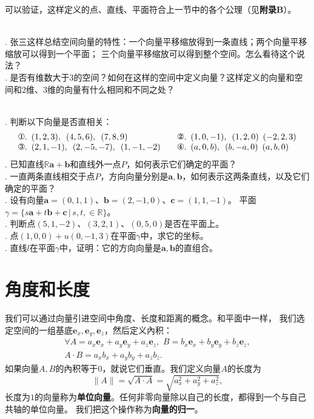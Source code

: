 \documentclass[12pt,UTF8]{ctexbook}
\begin{document}
可以验证，这样定义的点、直线、平面符合上一节中的各个公理（见\textbf{附录B}）。

\begin{sk}
    \mbox{}  \\
    . 张三这样总结空间向量的特性：一个向量平移缩放得到一条直线；两个向量平移缩放可以得到一个平面；
    三个向量平移缩放可以得到整个空间。怎么看待这个说法？\\
    . 是否有维数大于$3$的空间？如何在这样的空间中定义向量？这样定义的向量和空间和$2$维、$3$维的向量有什么相同和不同之处？
\end{sk}

\begin{xt}
    \mbox{}  \\
    . 判断以下向量是否直相关：\\
    $$
    \begin{array}{ll}
        \mbox{\ding{172}}.\,\,\, (1,2,3),\,\,\,(4,5,6), \,\,\,(7,8,9) \quad & \mbox{\ding{173}}.\,\,\, (1,0,-1),\,\,\, (1,2,0) \,\,\,(-2,2,3)  \\
        \mbox{\ding{174}}.\,\,\, (2,1,-1), \,\,\, (2,-5,-7), \,\,\,(1,-1,-2) \quad & \mbox{\ding{175}}.\,\,\, (a,0,b),\,\,\, (b,-a,0) \,\,\,(a,b,0) 
    \end{array}
    $$
    . 已知直线$\mathbb{R}\mathbf{a}+\mathbf{b}$和直线外一点$P$，如何表示它们确定的平面？\\
    . 一直两条直线相交于点$P$，方向向量分别是$\mathbf{a},\mathbf{b}$，如何表示这两条直线，以及它们确定的平面？\\
    . 设有向量$\mathbf{a}=(0,1,1)$、$\mathbf{b}=(2,-1,0)$、$\mathbf{c}=(1,1,-1)$。
    平面$\gamma = \{s\mathbf{a} + t\mathbf{b} + \mathbf{c} \, | \, s,t,\in\mathbb{R}\}$。\\
    . 判断点$(5,1,-2)$、$(3,2,1)$、$(0,5,0)$是否在平面上。\\
    . 点$(1,0,0)+u(0,-1,3)$在平面$\gamma$中，求它的坐标。\\
    . 直线$l$在平面$\gamma$中，证明：它的方向向量是$\mathbf{a},\mathbf{b}$的直组合。
\end{xt}

\section{角度和长度}
我们可以通过向量引进空间中角度、长度和距离的概念。和平面中一样，
我们选定空间的一组基底$\mathbf{e}_x,\mathbf{e}_y,\mathbf{e}_z$，然后定义內积：
$$
\begin{array}{c}
    \forall  A = a_x\mathbf{e}_x+a_y\mathbf{e}_y+a_z\mathbf{e}_z,\,\,B = b_x\mathbf{e}_x+b_y\mathbf{e}_y+b_z\mathbf{e}_z,  \\
     A\cdot B = a_xb_x + a_yb_y + a_zb_z. 
\end{array}
$$ 
如果向量$A,B$的內积等于$0$，就说它们垂直。我们定义向量$A$的长度为
$$\|A\| = \sqrt{A\cdot A} = \sqrt{a_x^2 + a_y^2 + a_z^2},$$
长度为$1$的向量称为\textbf{单位向量}。任何非零向量除以自己的长度，都得到一个与自己共轴的单位向量。
我们把这个操作称为\textbf{向量的归一}。
\end{document}
